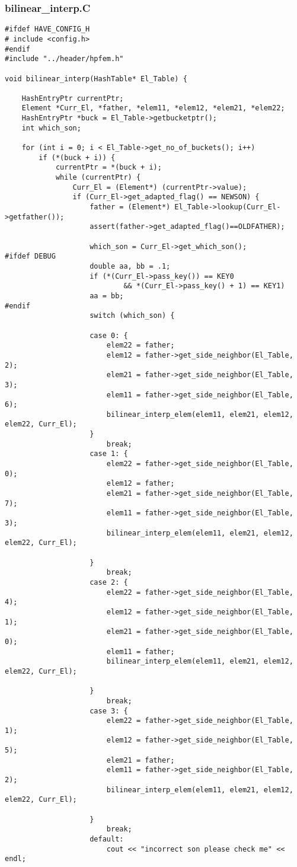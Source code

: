 \documentclass[a4paper,10pt]{article}
\begin{document}
\subsubsection{bilinear\_interp.C}
\begin{lstlisting}
#ifdef HAVE_CONFIG_H
# include <config.h>
#endif
#include "../header/hpfem.h"

void bilinear_interp(HashTable* El_Table) {

	HashEntryPtr currentPtr;
	Element *Curr_El, *father, *elem11, *elem12, *elem21, *elem22;
	HashEntryPtr *buck = El_Table->getbucketptr();
	int which_son;

	for (int i = 0; i < El_Table->get_no_of_buckets(); i++)
		if (*(buck + i)) {
			currentPtr = *(buck + i);
			while (currentPtr) {
				Curr_El = (Element*) (currentPtr->value);
				if (Curr_El->get_adapted_flag() == NEWSON) {
					father = (Element*) El_Table->lookup(Curr_El->getfather());
					assert(father->get_adapted_flag()==OLDFATHER);

					which_son = Curr_El->get_which_son();
#ifdef DEBUG
					double aa, bb = .1;
					if (*(Curr_El->pass_key()) == KEY0
							&& *(Curr_El->pass_key() + 1) == KEY1)
					aa = bb;
#endif
					switch (which_son) {

					case 0: {
						elem22 = father;
						elem12 = father->get_side_neighbor(El_Table, 2);
						elem21 = father->get_side_neighbor(El_Table, 3);
						elem11 = father->get_side_neighbor(El_Table, 6);
						bilinear_interp_elem(elem11, elem21, elem12, elem22, Curr_El);
					}
						break;
					case 1: {
						elem22 = father->get_side_neighbor(El_Table, 0);
						elem12 = father;
						elem21 = father->get_side_neighbor(El_Table, 7);
						elem11 = father->get_side_neighbor(El_Table, 3);
						bilinear_interp_elem(elem11, elem21, elem12, elem22, Curr_El);

					}
						break;
					case 2: {
						elem22 = father->get_side_neighbor(El_Table, 4);
						elem12 = father->get_side_neighbor(El_Table, 1);
						elem21 = father->get_side_neighbor(El_Table, 0);
						elem11 = father;
						bilinear_interp_elem(elem11, elem21, elem12, elem22, Curr_El);

					}
						break;
					case 3: {
						elem22 = father->get_side_neighbor(El_Table, 1);
						elem12 = father->get_side_neighbor(El_Table, 5);
						elem21 = father;
						elem11 = father->get_side_neighbor(El_Table, 2);
						bilinear_interp_elem(elem11, elem21, elem12, elem22, Curr_El);

					}
						break;
					default:
						cout << "incorrect son please check me" << endl;


\end{lstlisting}
\end{document}
